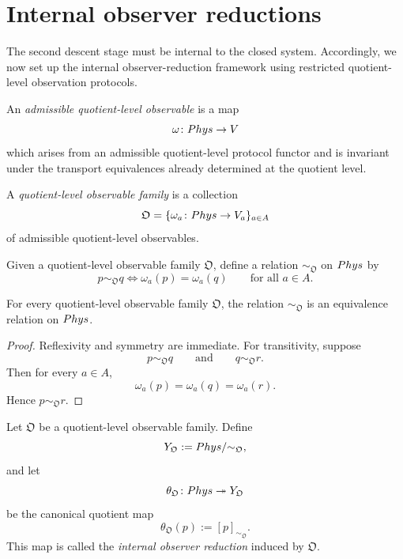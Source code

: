 \section{Internal observer reductions}
The second descent stage must be internal to the closed system.
Accordingly, we now set up the internal observer-reduction framework
using restricted quotient-level observation protocols.
\begin{definition}
	An \emph{admissible quotient-level observable} is a map
	\[
		\omega\colon Phys\to V
	\]
	which arises from an admissible quotient-level protocol functor and is
	invariant under the transport equivalences already determined at the
	quotient level.
\end{definition}
\begin{definition}
	A \emph{quotient-level observable family} is a collection
	\[
		\mathfrak O=\{\omega_a\colon Phys\to V_a\}_{a\in A}
	\]
	of admissible quotient-level observables.
\end{definition}
\begin{definition}
	Given a quotient-level observable family \(\mathfrak O\), define a
	relation \(\sim_{\mathfrak O}\) on \(Phys\) by
	\[
		p\sim_{\mathfrak O}q
		\iff
		\omega_a(p)=\omega_a(q)
		\qquad
		\text{for all }a\in A.
	\]
\end{definition}
\begin{lemma}
	For every quotient-level observable family \(\mathfrak O\), the relation
	\(\sim_{\mathfrak O}\) is an equivalence relation on \(Phys\).
\end{lemma}
\begin{proof}
	Reflexivity and symmetry are immediate. For transitivity, suppose
	\[
		p\sim_{\mathfrak O}q
		\qquad
		\text{and}
		\qquad
		q\sim_{\mathfrak O}r.
	\]
	Then for every \(a\in A\),
	\[
		\omega_a(p)=\omega_a(q)=\omega_a(r).
	\]
	Hence \(p\sim_{\mathfrak O}r\).
\end{proof}
\begin{definition}
	Let \(\mathfrak O\) be a quotient-level observable family. Define
	\[
		Y_{\mathfrak O}:=Phys/{\sim_{\mathfrak O}},
	\]
	and let
	\[
		\theta_{\mathfrak O}\colon Phys\twoheadrightarrow Y_{\mathfrak O}
	\]
	be the canonical quotient map
	\[
		\theta_{\mathfrak O}(p):=[p]_{\sim_{\mathfrak O}}.
	\]
	This map is called the \emph{internal observer reduction} induced by
	\(\mathfrak O\).
\end{definition}
